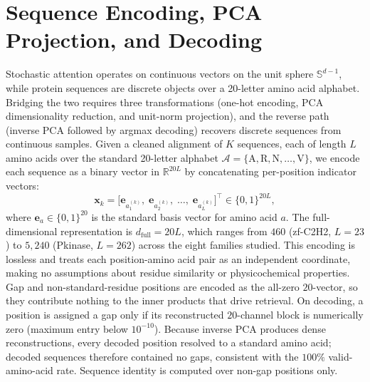 \documentclass[10pt]{article}
\begin{document}
\section{Sequence Encoding, PCA Projection, and Decoding}\label{si:pca}

Stochastic attention operates on continuous vectors on the unit sphere $\mathbb{S}^{d-1}$, while protein sequences are discrete objects over a 20-letter amino acid alphabet. Bridging the two requires three transformations (one-hot encoding, PCA dimensionality reduction, and unit-norm projection), and the reverse path (inverse PCA followed by argmax decoding) recovers discrete sequences from continuous samples. Given a cleaned alignment of $K$ sequences, each of length $L$ amino acids over the standard 20-letter alphabet $\mathcal{A} = \{\text{A}, \text{R}, \text{N}, \ldots, \text{V}\}$, we encode each sequence as a binary vector in $\mathbb{R}^{20L}$ by concatenating per-position indicator vectors:
\begin{equation}
    \mathbf{x}_k = \bigl[\mathbf{e}_{a_1^{(k)}},\; \mathbf{e}_{a_2^{(k)}},\; \ldots,\; \mathbf{e}_{a_L^{(k)}}\bigr]^\top \in \{0,1\}^{20L},
\end{equation}
where $\mathbf{e}_a \in \{0,1\}^{20}$ is the standard basis vector for amino acid $a$. The full-dimensional representation is $d_{\mathrm{full}} = 20L$, which ranges from $460$ (zf-C2H2, $L{=}23$) to $5{,}240$ (Pkinase, $L{=}262$) across the eight families studied. This encoding is lossless and treats each position-amino acid pair as an independent coordinate, making no assumptions about residue similarity or physicochemical properties. Gap and non-standard-residue positions are encoded as the all-zero $20$-vector, so they contribute nothing to the inner products that drive retrieval. On decoding, a position is assigned a gap only if its reconstructed $20$-channel block is numerically zero (maximum entry below $10^{-10}$). Because inverse PCA produces dense reconstructions, every decoded position resolved to a standard amino acid; decoded sequences therefore contained no gaps, consistent with the $100\%$ valid-amino-acid rate. Sequence identity is computed over non-gap positions only.
\end{document}
